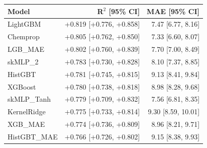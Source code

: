 \begin{tabular}{lrr}
\toprule
Model & R$^2$ [95\% CI] & MAE [95\% CI] \\
\midrule
LightGBM & +0.819 [+0.776, +0.858] & 7.47 [6.77, 8.16] \\
Chemprop & +0.805 [+0.762, +0.850] & 7.33 [6.60, 8.07] \\
LGB\_MAE & +0.802 [+0.760, +0.839] & 7.70 [7.00, 8.49] \\
skMLP\_2 & +0.783 [+0.730, +0.828] & 8.10 [7.37, 8.85] \\
HistGBT & +0.781 [+0.745, +0.815] & 9.13 [8.41, 9.84] \\
XGBoost & +0.780 [+0.738, +0.818] & 8.98 [8.28, 9.68] \\
skMLP\_Tanh & +0.779 [+0.709, +0.832] & 7.56 [6.81, 8.35] \\
KernelRidge & +0.775 [+0.733, +0.814] & 9.30 [8.59, 10.01] \\
XGB\_MAE & +0.774 [+0.736, +0.809] & 8.96 [8.21, 9.71] \\
HistGBT\_MAE & +0.766 [+0.726, +0.802] & 9.15 [8.38, 9.93] \\
\bottomrule
\end{tabular}